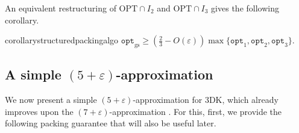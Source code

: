 \documentclass[10pt,a4paper]{amsart}
\newcommand{\eps}{\varepsilon}
\renewcommand{\epsilon}{\varepsilon} %
\newcommand{\tdk}{\textsc{3DK}}
\theoremstyle{definition}
\newcommand{\opt}{\mathtt{opt}}
\newcommand{\optgs}{\mathtt{opt}_{\mathrm{gs}}}
\begin{document}
An equivalent restructuring of $\text{OPT}\cap I_2$ and $\text{OPT}\cap I_3$ gives the following corollary.

\begin{restatable}{corollary}{structuredpackingalgo}
\label{thm:structuredpackingalgo}
    $\optgs \ge \left(\frac{2}{3}-O(\epsilon)\right) \max\{\opt_1, \opt_2, \opt_3\}$.
\end{restatable}













\subsection{A simple \texorpdfstring{$(5+\eps)$}{5+ε}-approximation}
\label{sec:5approx}
We now present a simple $(5+\epsilon)$-approximation for \tdk, which already improves upon the $(7+\epsilon)$-approximation \cite{3d-knapsack}. For this, first, we provide the following packing guarantee that will also be useful later.
\end{document}
